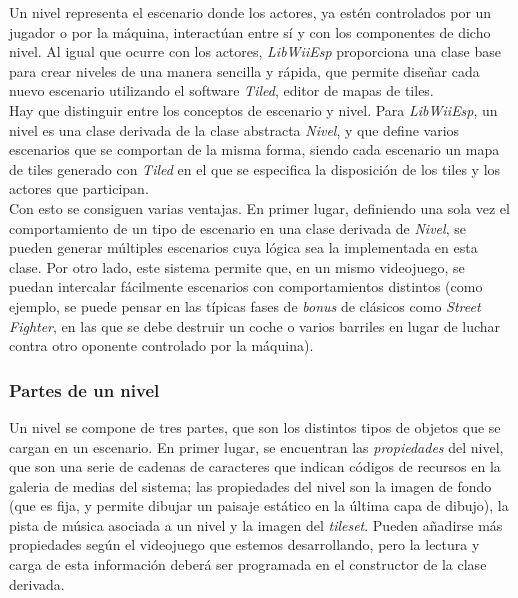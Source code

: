 
Un nivel representa el escenario donde los actores, ya estén controlados por un jugador o por la máquina, interactúan entre sí y con los componentes de dicho nivel. Al igual que ocurre con los actores, \emph{LibWiiEsp} proporciona una clase base para crear niveles de una manera sencilla y rápida, que permite diseñar cada nuevo escenario utilizando el software \emph{Tiled}, editor de mapas de tiles.\\

Hay que distinguir entre los conceptos de escenario y nivel. Para \emph{LibWiiEsp}, un nivel es una clase derivada de la clase abstracta \emph{Nivel}, y que define varios escenarios que se comportan de la misma forma, siendo cada escenario un mapa de tiles generado con \emph{Tiled} en el que se especifica la disposición de los tiles y los actores que participan.\\

Con esto se consiguen varias ventajas. En primer lugar, definiendo una sola vez el comportamiento de un tipo de escenario en una clase derivada de \emph{Nivel}, se pueden generar múltiples escenarios cuya lógica sea la implementada en esta clase. Por otro lado, este sistema permite que, en un mismo videojuego, se puedan intercalar fácilmente escenarios con comportamientos distintos (como ejemplo, se puede pensar en las típicas fases de \emph{bonus} de clásicos como \emph{Street Fighter}, en las que se debe destruir un coche o varios barriles en lugar de luchar contra otro oponente controlado por la máquina).

\subsubsection{Partes de un nivel}

Un nivel se compone de tres partes, que son los distintos tipos de objetos que se cargan en un escenario. En primer lugar, se encuentran las \emph{propiedades} del nivel, que son una serie de cadenas de caracteres que indican códigos de recursos en la galeria de medias del sistema; las propiedades del nivel son la imagen de fondo (que es fija, y permite dibujar un paisaje estático en la última capa de dibujo), la pista de música asociada a un nivel y la imagen del \emph{tileset}. Pueden añadirse más propiedades según el videojuego que estemos desarrollando, pero la lectura y carga de esta información deberá ser programada en el constructor de la clase derivada.

